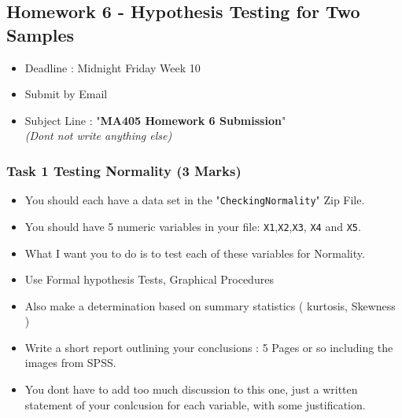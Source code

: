 \documentclass[a4paper,12pt]{article}
\begin{document}
\subsection*{Homework 6 - Hypothesis Testing for Two Samples}

	\begin{framed}
		\begin{itemize}
			\item Deadline : Midnight Friday Week 10
			\item Submit by Email
			\item Subject Line : "\textbf{MA405 Homework 6 Submission}" \\ \textit{(Dont not write anything else)}
		\end{itemize}
	\end{framed}
\subsubsection*{Task 1 Testing Normality (3 Marks) }
\begin{itemize}
	\item You should each have a data set in the "\texttt{CheckingNormality}" Zip File.
	
\item You should have 5 numeric variables in your file: \texttt{X1},\texttt{X2},\texttt{X3}, \texttt{X4} and \texttt{X5}.
	
\item What I want you to do is to test each of these variables for Normality.
\item Use Formal hypothesis Tests, Graphical Procedures
\item Also make a determination based on summary statistics ( kurtosis, Skewness )

%

\item Write a short report outlining your conclusions : 5 Pages or so including the images from SPSS. 
\item You dont have to add too much discussion to this one, just a written statement of your conlcusion for each variable, with some justification.
\end{itemize}
\bigskip
\end{document}
